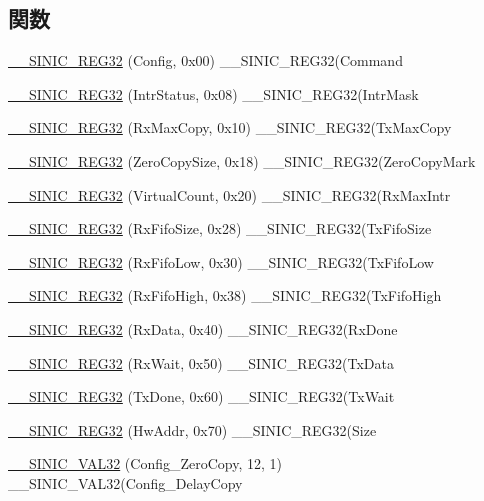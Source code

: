 \subsection*{関数}
\begin{DoxyCompactItemize}
\item 
\hyperlink{namespaceSinic_1_1Regs_a31365c3b0fb6f3c08f07d4d1973e67dc}{\_\-\_\-SINIC\_\-REG32} (Config, 0x00) \_\-\_\-SINIC\_\-REG32(Command
\item 
\hyperlink{namespaceSinic_1_1Regs_ae9e6da6218a23a767dca42953dad3015}{\_\-\_\-SINIC\_\-REG32} (IntrStatus, 0x08) \_\-\_\-SINIC\_\-REG32(IntrMask
\item 
\hyperlink{namespaceSinic_1_1Regs_a0ec120af1a8417ba2da388fda2040f13}{\_\-\_\-SINIC\_\-REG32} (RxMaxCopy, 0x10) \_\-\_\-SINIC\_\-REG32(TxMaxCopy
\item 
\hyperlink{namespaceSinic_1_1Regs_a733ff438a1c604231e6ce036a1afc41b}{\_\-\_\-SINIC\_\-REG32} (ZeroCopySize, 0x18) \_\-\_\-SINIC\_\-REG32(ZeroCopyMark
\item 
\hyperlink{namespaceSinic_1_1Regs_a7fe36ceaf3dbf7a66169db9e96b382ae}{\_\-\_\-SINIC\_\-REG32} (VirtualCount, 0x20) \_\-\_\-SINIC\_\-REG32(RxMaxIntr
\item 
\hyperlink{namespaceSinic_1_1Regs_a444fe1ce17e955406f1bcf070db4cda1}{\_\-\_\-SINIC\_\-REG32} (RxFifoSize, 0x28) \_\-\_\-SINIC\_\-REG32(TxFifoSize
\item 
\hyperlink{namespaceSinic_1_1Regs_ae73e3b2162fe008633db77180394781a}{\_\-\_\-SINIC\_\-REG32} (RxFifoLow, 0x30) \_\-\_\-SINIC\_\-REG32(TxFifoLow
\item 
\hyperlink{namespaceSinic_1_1Regs_af0e185e22ef1e687372ab3ac6a329076}{\_\-\_\-SINIC\_\-REG32} (RxFifoHigh, 0x38) \_\-\_\-SINIC\_\-REG32(TxFifoHigh
\item 
\hyperlink{namespaceSinic_1_1Regs_a121f175cc8ac696905c4f0709d714888}{\_\-\_\-SINIC\_\-REG32} (RxData, 0x40) \_\-\_\-SINIC\_\-REG32(RxDone
\item 
\hyperlink{namespaceSinic_1_1Regs_a4ef4b9c089872d14c224869000a19bc4}{\_\-\_\-SINIC\_\-REG32} (RxWait, 0x50) \_\-\_\-SINIC\_\-REG32(TxData
\item 
\hyperlink{namespaceSinic_1_1Regs_ad4b2b5daf8ff0c89d4c61ed6fa9f9593}{\_\-\_\-SINIC\_\-REG32} (TxDone, 0x60) \_\-\_\-SINIC\_\-REG32(TxWait
\item 
\hyperlink{namespaceSinic_1_1Regs_a0edc4338948527dbb92f65cd30bdf13b}{\_\-\_\-SINIC\_\-REG32} (HwAddr, 0x70) \_\-\_\-SINIC\_\-REG32(Size
\item 
\hyperlink{namespaceSinic_1_1Regs_ade19c3f47499bb3575e71cfa918cf31e}{\_\-\_\-SINIC\_\-VAL32} (Config\_\-ZeroCopy, 12, 1) \_\-\_\-SINIC\_\-VAL32(Config\_\-DelayCopy

\end{DoxyCompactItemize}
